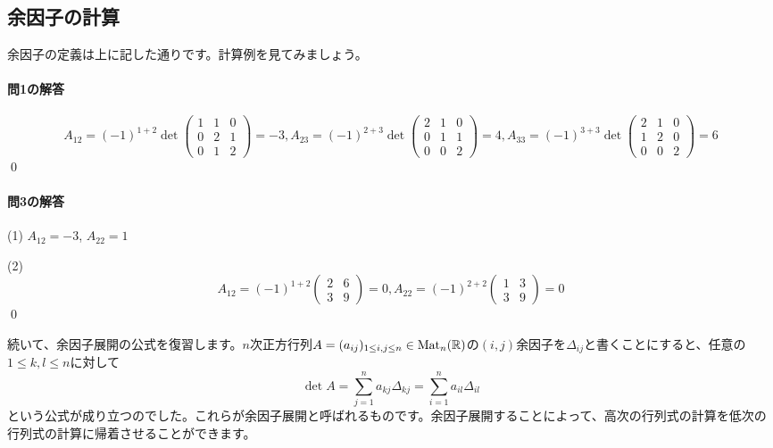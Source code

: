 \subsection{余因子の計算}

余因子の定義は上に記した通りです。計算例を見てみましょう。

\paragraph{問1の解答}

\[
A_{12} = (-1)^{1 + 2} \det
\begin{pmatrix}
1 & 1 & 0 \\
0 & 2 & 1 \\
0 & 1 & 2
\end{pmatrix}
= -3, 
A_{23} = (-1)^{2 + 3} \det
\begin{pmatrix}
2 & 1 & 0 \\
0 & 1 & 1 \\
0 & 0 & 2
\end{pmatrix}
= 4, 
A_{33} = (-1)^{3 + 3} \det
\begin{pmatrix}
2 & 1 & 0 \\
1 & 2 & 0 \\
0 & 0 & 2
\end{pmatrix}
= 6
\]
\qed

\paragraph{問3の解答}

(1) $A_{12} = -3$, $A_{22} = 1$

\noindent (2)
\[
A_{12} = (-1)^{1 + 2}
\begin{pmatrix}
2 & 6 \\
3 & 9
\end{pmatrix}
= 0, 
A_{22} = (-1)^{2 + 2}
\begin{pmatrix}
1 & 3 \\
3 & 9
\end{pmatrix}
= 0
\]
\qed

続いて、余因子展開の公式を復習します。$n$次正方行列$A = (a_{ij})_{1 \leq i, j \leq n} \in \operatorname{Mat}_n(\mathbb{R})$の$(i, j)$余因子を$\Delta_{ij}$と書くことにすると、任意の$1 \leq k, l \leq n$に対して
\[
\det A = \sum_{j = 1}^n a_{kj} \Delta_{kj} = \sum_{i = 1}^n a_{il} \Delta_{il}
\]
という公式が成り立つのでした。これらが余因子展開と呼ばれるものです。余因子展開することによって、高次の行列式の計算を低次の行列式の計算に帰着させることができます。

